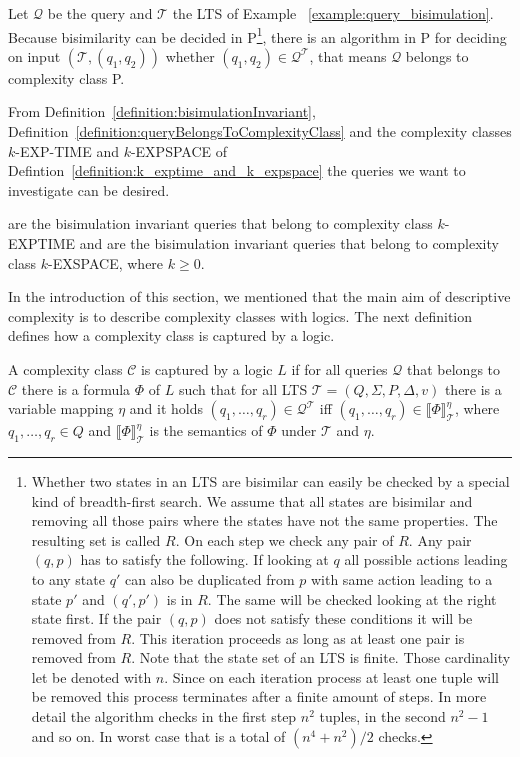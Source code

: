 \begin{example}{\cite{lange2014capturing}}
    Let $\mathcal{Q}$ be the query and $\mathcal{T}$ the LTS of Example~
    \ref{example:query_bisimulation}. Because bisimilarity can be decided in P\footnote{Whether two states in an LTS are bisimilar can easily be checked by a special kind of breadth-first search. We assume that all states are bisimilar and removing all those pairs where the states have not 
    the same properties. The resulting set is called $R$. On each step we check any pair of $R$. Any pair $(q, p)$ has to satisfy the following. If looking at $q$ all possible actions leading to any state $q'$ can also be duplicated from $p$ with same action leading to a state $p'$ and $(q', p')$ is in $R$. The same will be checked looking 
    at the right state first. If the pair $(q, p)$ does not satisfy these conditions it will be removed from $R$. This 
    iteration proceeds as long as at least one pair is removed from $R$. Note that the state set of an LTS is finite. Those cardinality let be denoted with $n$. Since on each iteration process at least one tuple will be removed this process terminates after a finite amount of steps. In more detail the algorithm checks in the first step $n^2$ tuples, in the second $n^2 - 1$ and so on. In worst case that is a total of $(n^4 + n^2)/2$ checks.}, 
    there is an 
    algorithm in P for deciding on input $(\mathcal{T}, (q_1, q_2))$ whether $(q_1, q_2) \in 
    \mathcal{Q}^\mathcal{T}$, that means $\mathcal{Q}$ belongs to 
    complexity class P.
\end{example}

From Definition~\ref{definition:bisimulationInvariant}, Definition~\ref{definition:queryBelongsToComplexityClass}
and the complexity classes $k$-EXP-TIME and $k$-EXPSPACE of Defintion~\ref{definition:k_exptime_and_k_expspace}
the queries we want to investigate can be desired.

\begin{definition}
    \label{definition:kExptimekExpspace}
     are the bisimulation invariant queries that belong to complexity class $k$-EXPTIME and
     are the bisimulation invariant queries that belong to complexity class $k$-EXSPACE, where $k \geq 0$.
\end{definition}

In the introduction of this section, we mentioned that the main aim of descriptive complexity is to describe complexity classes with logics. The next definition defines how a complexity class is captured by a logic. 

\begin{definition}
A complexity class $\mathcal{C}$ is captured by a logic $L$ if for all queries $\mathcal{Q}$ that belongs to $\mathcal{C}$ there is a formula $\Phi$ of $L$ such that for all LTS $\mathcal{T} = (Q, \Sigma, P, \Delta, v)$ there is a variable mapping $\eta$ and it holds $(q_1, \dots, q_{r}) \in \mathcal{Q}^\mathcal{T}$ iff $(q_1, \dots, q_{r}) \in \llbracket \Phi \rrbracket^\eta_\mathcal{T}$, where $q_1, \dots, q_r \in Q$ and $\llbracket \Phi \rrbracket^\eta_\mathcal{T}$ is the semantics of $\Phi$ under $\mathcal{T}$ and $\eta$.
\end{definition}

